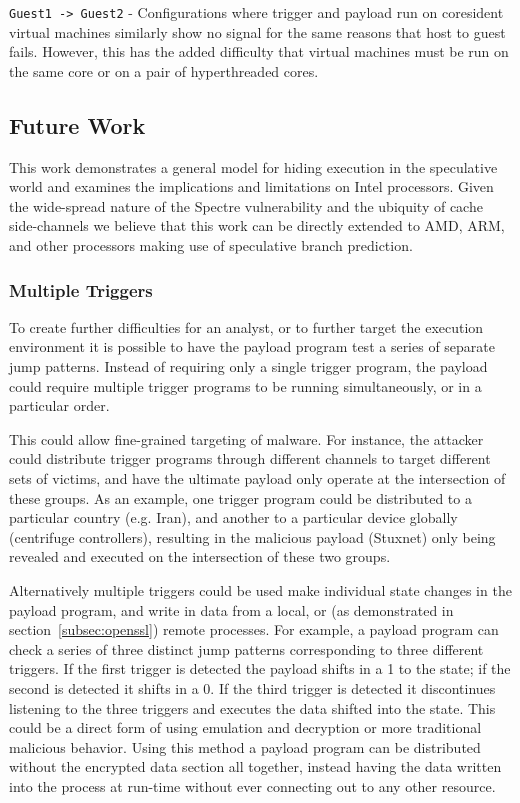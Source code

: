 \texttt{Guest1 -> Guest2} - Configurations where trigger and payload 
run on coresident virtual machines similarly show no signal for the same 
reasons that host to guest \speculake fails. However, this has the added difficulty
that virtual machines must be run on the same core or on a pair of 
hyperthreaded cores.




\subsection{Future Work}
\label{subsec:future-work}

This work demonstrates a general model for hiding execution in 
the speculative world and examines the implications and limitations on 
Intel processors. Given the wide-spread nature of the Spectre vulnerability 
and the ubiquity of cache side-channels we believe that this work can 
be directly extended to AMD, ARM, and other processors making use of
speculative branch prediction.

\subsubsection{Multiple Triggers}
To create further difficulties for an analyst, or to further target the
execution environment it is possible to have the payload program test a series
of separate jump patterns. Instead of requiring only a single trigger program,
the payload could require multiple trigger programs to be running
simultaneously, or in a particular order.

This could allow fine-grained targeting of malware. For instance, the attacker
could distribute trigger programs through different channels to target different sets
of victims, and have the ultimate payload only operate at the intersection of
these groups. As an example, one trigger program could be distributed to a
particular country (e.g. Iran), and another to a particular device globally
(centrifuge controllers), resulting in the malicious payload (Stuxnet) only
being revealed and executed on the intersection of these two groups.


\smallskip

Alternatively multiple triggers could be used make individual state changes in
the payload program, and write in data from a local, or (as demonstrated in
section~\ref{subsec:openssl}) remote processes. For example, a payload program
can check a series of three distinct jump patterns corresponding to three
different triggers. If the first trigger is detected the payload shifts in a 1
to the state; if the second is detected it shifts in a 0. If the third trigger
is detected it discontinues listening to the three triggers and executes the
data shifted into the state.
This could be a direct form of \speculake using emulation and
decryption or more traditional malicious behavior. Using this method a payload
program can be distributed without the encrypted data section all together,
instead having the data written into the process at run-time without ever
connecting out to any other resource.

